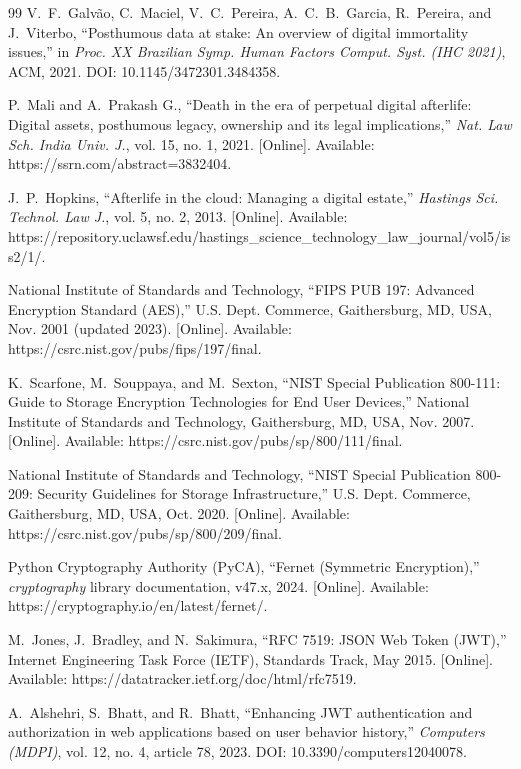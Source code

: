 \documentclass[12pt, a4paper]{article}
\begin{document}
\begin{thebibliography}{99}
V.~F.~Galv\~{a}o, C.~Maciel, V.~C.~Pereira, A.~C.~B.~Garcia, R.~Pereira, and J.~Viterbo, ``Posthumous data at stake: An overview of digital immortality issues,'' in \textit{Proc. XX Brazilian Symp. Human Factors Comput. Syst. (IHC 2021)}, ACM, 2021. DOI: 10.1145/3472301.3484358.

P.~Mali and A.~Prakash G., ``Death in the era of perpetual digital afterlife: Digital assets, posthumous legacy, ownership and its legal implications,'' \textit{Nat. Law Sch. India Univ. J.}, vol. 15, no. 1, 2021. [Online]. Available: https://ssrn.com/abstract=3832404.

J.~P.~Hopkins, ``Afterlife in the cloud: Managing a digital estate,'' \textit{Hastings Sci. Technol. Law J.}, vol. 5, no. 2, 2013. [Online]. Available: https://repository.uclawsf.edu/hastings\_science\_technology\_law\_journal/vol5/iss2/1/.

National Institute of Standards and Technology, ``FIPS PUB 197: Advanced Encryption Standard (AES),'' U.S. Dept. Commerce, Gaithersburg, MD, USA, Nov. 2001 (updated 2023). [Online]. Available: https://csrc.nist.gov/pubs/fips/197/final.

K.~Scarfone, M.~Souppaya, and M.~Sexton, ``NIST Special Publication 800-111: Guide to Storage Encryption Technologies for End User Devices,'' National Institute of Standards and Technology, Gaithersburg, MD, USA, Nov. 2007. [Online]. Available: https://csrc.nist.gov/pubs/sp/800/111/final.

National Institute of Standards and Technology, ``NIST Special Publication 800-209: Security Guidelines for Storage Infrastructure,'' U.S. Dept. Commerce, Gaithersburg, MD, USA, Oct. 2020. [Online]. Available: https://csrc.nist.gov/pubs/sp/800/209/final.

Python Cryptography Authority (PyCA), ``Fernet (Symmetric Encryption),'' \textit{cryptography} library documentation, v47.x, 2024. [Online]. Available: https://cryptography.io/en/latest/fernet/.

M.~Jones, J.~Bradley, and N.~Sakimura, ``RFC 7519: JSON Web Token (JWT),'' Internet Engineering Task Force (IETF), Standards Track, May 2015. [Online]. Available: https://datatracker.ietf.org/doc/html/rfc7519.

A.~Alshehri, S.~Bhatt, and R.~Bhatt, ``Enhancing JWT authentication and authorization in web applications based on user behavior history,'' \textit{Computers (MDPI)}, vol. 12, no. 4, article 78, 2023. DOI: 10.3390/computers12040078.


\end{thebibliography}
\end{document}
